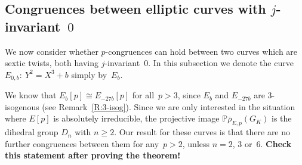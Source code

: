 \documentclass[12pt, reqno]{amsart}
\newcommand{\PP}{\mathbb{P}}
\newcommand{\rhobar}{{\overline{\rho}}}
\numberwithin{equation}{section}
\theoremstyle{definition}
\theoremstyle{remark}
\begin{document}



\subsection{Congruences between elliptic curves with
  $j$-invariant~$0$}

We now consider whether $p$-congruences can hold between two curves
which are sextic twists, both having $j$-invariant~$0$.  In this
subsection we denote the curve $E_{0,b}:\ Y^2=X^3+b$ simply by~$E_b$.

We know that $E_b[p]\cong E_{-27b}[p]$ for all~$p>3$, since $E_b$ and
$E_{-27b}$ are $3$-isogenous (see Remark~\ref{R:3-isog}).  Since we
are only interested in the situation where $E[p]$ is absolutely
irreducible, the projective image $\PP\rhobar_{E,p}(G_K)$ is the
dihedral group $D_n$ with $n\ge2$.  Our result for these curves is
that there are no further congruences between them for any~$p>2$,
unless $n=2$, $3$ or~$6$. \textbf{Check this statement after proving
  the theorem!}
\end{document}

